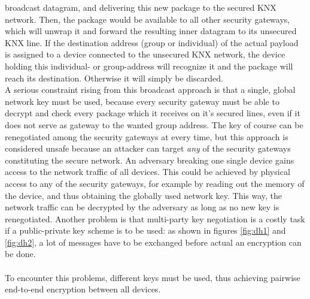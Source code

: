 broadcast datagram, and delivering this new package to the secured KNX network. Then, the package would be available to all other security gateways, which
will unwrap it and forward the resulting inner datagram to its unsecured KNX line. If the destination address (group or individual) of the actual payload
is assigned to a device connected
to the unsecured KNX network, the device holding this individual- or group-address will recognize it and the package will reach its destination. 
Otherwise it will simply be discarded.
\\
A serious constraint rising from this broadcast approach is that a single,
global network key must be used, because every security gateway must be able to decrypt and check every package which it receives on it's secured lines,
even if it does not serve as gateway to the wanted group address. 
The key of course can be renegotiated among the security gateways at every time, but this approach is considered
unsafe because an attacker can target \textit{any} of the security gateways constituting the secure network. An adversary breaking one single device gains
access to the network traffic of all devices. This could be achieved by physical access to any of the security gateways, for example by reading out the
memory of the device, and thus obtaining the globally used network key. This way, the network traffic can be decrypted by the adversary as long as no new
key is renegotiated. Another problem is that multi-party key negotiation is a costly task if a public-private key scheme
is to be used: as shown in figures \ref{fig:dh1} and \ref{fig:dh2}, a lot of messages have to be exchanged before actual an encryption can be done. 
\\
\\
To encounter this problems, different keys must be used, thus achieving pairwise end-to-end encryption between all devices. 
